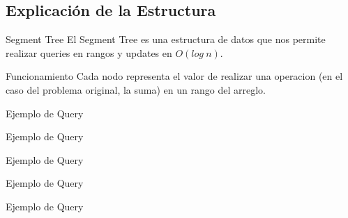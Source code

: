 \documentclass{beamer}
\begin{document}
\subsection{Explicación de la Estructura}
\begin{frame}{Segment Tree}
El Segment Tree es una estructura de datos que nos permite realizar queries en rangos y updates en $O(log\:n)$.
\pause



\end{frame}

\begin{frame}{Funcionamiento}
Cada nodo representa el valor de realizar una operacion (en el caso del problema original, la suma) en un rango del arreglo.


\end{frame}

\begin{frame}{Ejemplo de Query}

\end{frame}

\begin{frame}{Ejemplo de Query}

\end{frame}

\begin{frame}{Ejemplo de Query}

\end{frame}

\begin{frame}{Ejemplo de Query}

\end{frame}

\begin{frame}{Ejemplo de Query}

\end{frame}
\end{document}

